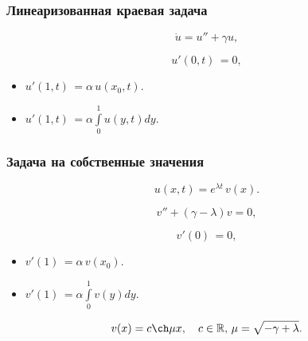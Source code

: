 \documentclass[fullscreen=true, unicode, bookmarks=false]{beamer}
\begin{document}
\begin{frame}
\frametitle{ Линеаризованная краевая задача }
 
\begin{equation}
	\dot u = u'' + \gamma u,	
\end{equation}

\vfill

$$ u'(0, t) \, = 0, $$

\vfill

\begin{itemize}

\item $ u'(1, t) \, = \alpha\,u(x_0, t). $
\item $ u'(1, t) \, = \alpha\int\limits_{0}^{1} u(y, t) dy. $

\end{itemize}

\end{frame}

\begin{frame}
\frametitle{ Задача на собственные значения }
 
$$ u(x, t) = e^{\lambda t} \, v(x). $$

\bigskip
 
\begin{equation} 
	v'' + (\gamma - \lambda)v = 0,
\end{equation}

\vfill
	
$$ v'(0) \, = 0, $$

\vfill

\begin{itemize}

\item $ v'(1) \, = \alpha\,v(x_0). $
\item $ v'(1) \, = \alpha\int\limits_{0}^{1} v(y) dy. $

\end{itemize}

\vfill

$$ v(x) = c \ch  \mu x, \quad c \in \mathbb{R}, \, \mu = \sqrt{-\gamma + \lambda}. $$

\end{frame}
\end{document}
